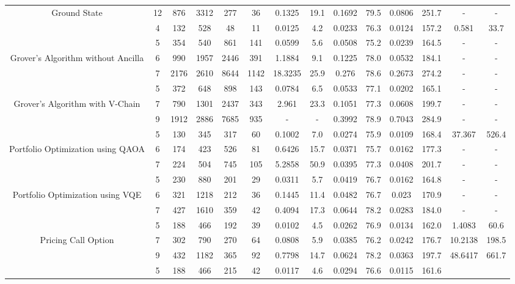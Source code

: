 \begin{table}[htb]
{\begin{tabular}{|c|c|c|c|c|c|c|c|c|c|c|c|c|c|}
Ground State & 
12 & 876 & 3312 & 277 & 36
 & 0.1325 & 19.1
 & 0.1692 & 79.5
 & 0.0806 & 251.7
 & - & -
 \\
 & 
4 & 132 & 528 & 48 & 11
 & 0.0125 & 4.2
 & 0.0233 & 76.3
 & 0.0124 & 157.2
 & 0.581 & 33.7
 \\
\hline
 & 
5 & 354 & 540 & 861 & 141
 & 0.0599 & 5.6
 & 0.0508 & 75.2
 & 0.0239 & 164.5
 & - & -
 \\
Grover's Algorithm without Ancilla & 
6 & 990 & 1957 & 2446 & 391
 & 1.1884 & 9.1
 & 0.1225 & 78.0
 & 0.0532 & 184.1
 & - & -
 \\
 & 
7 & 2176 & 2610 & 8644 & 1142
 & 18.3235 & 25.9
 & 0.276 & 78.6
 & 0.2673 & 274.2
 & - & -
 \\
\hline
 & 
5 & 372 & 648 & 898 & 143
 & 0.0784 & 6.5
 & 0.0533 & 77.1
 & 0.0202 & 165.1
 & - & -
 \\
Grover's Algorithm with V-Chain & 
7 & 790 & 1301 & 2437 & 343
 & 2.961 & 23.3
 & 0.1051 & 77.3
 & 0.0608 & 199.7
 & - & -
 \\
 & 
9 & 1912 & 2886 & 7685 & 935
 & - & -
 & 0.3992 & 78.9
 & 0.7043 & 284.9
 & - & -
 \\
\hline
 & 
5 & 130 & 345 & 317 & 60
 & 0.1002 & 7.0
 & 0.0274 & 75.9
 & 0.0109 & 168.4
 & 37.367 & 526.4
 \\
Portfolio Optimization using QAOA & 
6 & 174 & 423 & 526 & 81
 & 0.6426 & 15.7
 & 0.0371 & 75.7
 & 0.0162 & 177.3
 & - & -
 \\
 & 
7 & 224 & 504 & 745 & 105
 & 5.2858 & 50.9
 & 0.0395 & 77.3
 & 0.0408 & 201.7
 & - & -
 \\
\hline
 & 
5 & 230 & 880 & 201 & 29
 & 0.0311 & 5.7
 & 0.0419 & 76.7
 & 0.0162 & 164.8
 & - & -
 \\
Portfolio Optimization using VQE & 
6 & 321 & 1218 & 212 & 36
 & 0.1445 & 11.4
 & 0.0482 & 76.7
 & 0.023 & 170.9
 & - & -
 \\
 & 
7 & 427 & 1610 & 359 & 42
 & 0.4094 & 17.3
 & 0.0644 & 78.2
 & 0.0283 & 184.0
 & - & -
 \\
\hline
 & 
5 & 188 & 466 & 192 & 39
 & 0.0102 & 4.5
 & 0.0262 & 76.9
 & 0.0134 & 162.0
 & 1.4083 & 60.6
 \\
Pricing Call Option & 
7 & 302 & 790 & 270 & 64
 & 0.0808 & 5.9
 & 0.0385 & 76.2
 & 0.0242 & 176.7
 & 10.2138 & 198.5
 \\
 & 
9 & 432 & 1182 & 365 & 92
 & 0.7798 & 14.7
 & 0.0624 & 78.2
 & 0.0363 & 197.7
 & 48.6417 & 661.7
 \\
\hline
 & 
5 & 188 & 466 & 215 & 42
 & 0.0117 & 4.6
 & 0.0294 & 76.6
 & 0.0115 & 161.6

\end{tabular}}
\end{table}
